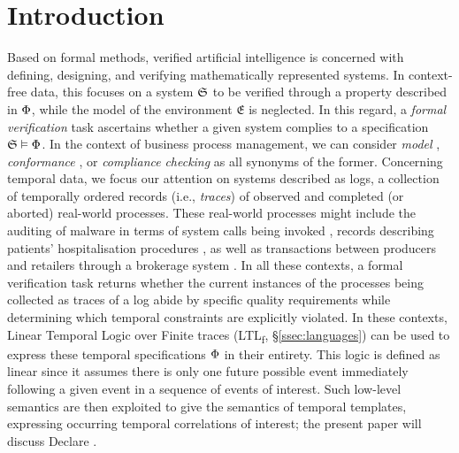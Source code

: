 \documentclass[sigconf]{acmart}
\begin{document}
\section{Introduction}
Based on formal methods, verified artificial intelligence \cite{DBLP:journals/cacm/SeshiaSS22} is concerned with defining, designing, and verifying mathematically represented systems. In context-free data, this focuses on a system $\mathfrak{S}$ to be verified through a property described in $\Phi$, while the model of the environment $\mathfrak{E}$ is neglected. In this regard, a \textit{formal verification} task ascertains whether a given system complies to a specification $\mathfrak{S}\vDash \Phi$. 
In the context of business process management, we can consider \textit{model} \cite{DBLP:books/daglib/0020348}, \textit{conformance} \cite{DBLP:conf/bpm/BergamiMMM21}, or \textit{compliance} \cite{DBLP:conf/bpm/AwadDW08,WEIDLICH20111009} \textit{checking} as all synonyms of the former. Concerning temporal data, we focus our attention on systems described as logs, a collection of temporally ordered records (i.e., \textit{traces}) of observed and completed (or aborted) real-world  processes. These real-world processes might include the auditing of malware in terms of system calls being invoked \cite{10.7717/peerj-cs.346,DBLP:conf/siu/YaziCG19}, records describing patients' hospitalisation procedures  \cite{8782520,XuPYYLZ20,https://doi.org/10.4121/uuid:d9769f3d-0ab0-4fb8-803b-0d1120ffcf54}, as well as transactions between producers and retailers through a brokerage system \cite{DBLP:conf/wbdb/PetermannJMR14}. In all these contexts, a formal verification task returns whether the current instances of the processes being collected as traces of a log abide by specific quality requirements while determining which temporal constraints are explicitly violated. In these contexts, Linear Temporal Logic over Finite traces (LTL\textsubscript{f}, \S\ref{ssec:languages}) \cite{DBLP:conf/ijcai/GiacomoV13} can be used to express these temporal specifications $\Phi$ in their entirety. This logic is defined as linear since it assumes there is only one future possible event immediately following a given event in a sequence of events of interest. Such low-level semantics are then exploited to give the semantics of temporal templates, expressing occurring temporal correlations of interest; the present paper will discuss Declare \cite{4384001}. 
\end{document}
